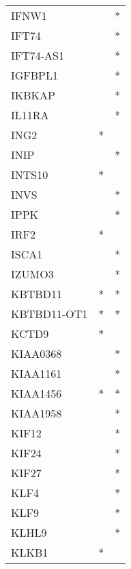 \begin{longtable}{lcc}
IFNW1                 &                &          * \\
IFT74                 &                &          * \\
IFT74-AS1             &                &          * \\
IGFBPL1               &                &          * \\
IKBKAP                &                &          * \\
IL11RA                &                &          * \\
ING2                  &              * &            \\
INIP                  &                &          * \\
INTS10                &              * &            \\
INVS                  &                &          * \\
IPPK                  &                &          * \\
IRF2                  &              * &            \\
ISCA1                 &                &          * \\
IZUMO3                &                &          * \\
KBTBD11               &              * &          * \\
KBTBD11-OT1           &              * &          * \\
KCTD9                 &              * &            \\
KIAA0368              &                &          * \\
KIAA1161              &                &          * \\
KIAA1456              &              * &          * \\
KIAA1958              &                &          * \\
KIF12                 &                &          * \\
KIF24                 &                &          * \\
KIF27                 &                &          * \\
KLF4                  &                &          * \\
KLF9                  &                &          * \\
KLHL9                 &                &          * \\
KLKB1                 &              * &            \\

\end{longtable}
